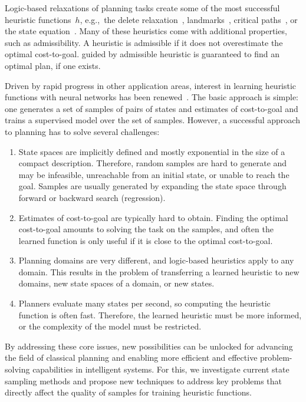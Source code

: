 Logic-based relaxations of planning tasks create some of the most successful heuristic functions~$h$, e.g.,~the delete relaxation~\cite{Hoffmann.Nebel/2001}, landmarks~\cite{hoffmann-et-al-jair2004,Karpas.Domshlak/2009}, critical paths~\cite{haslum-geffner-aips2000}, or the state equation~\cite{bonet-ijcai2013}. Many of these heuristics come with additional properties, such as admissibility. A heuristic is admissible if it does not overestimate the optimal cost-to-goal. \astar guided by admissible heuristic is guaranteed to find an optimal plan, if one exists.

Driven by rapid progress in other application areas, interest in learning heuristic functions with neural networks has been renewed~\cite{samadi-et-al-aaai2008,Arfaee.etal/2011,Agostinelli.etal/2019,Yu.etal/2020,Shen.etal/2020,Ferber.etal/2020a,Toyer.etal/2020,Ferber.etal/2022,OToole/2022}. The basic approach is simple: one generates a set of samples of pairs of states and estimates of cost-to-goal and trains a supervised model over the set of samples. However, a successful approach to planning has to solve several challenges:

\begin{enumerate}[label=C\arabic*),left=0pt]
    \itemsep0pt
    \item State spaces are implicitly defined and mostly exponential in the size of a compact description. Therefore, random samples are hard to generate and may be infeasible, unreachable from an initial state, or unable to reach the goal. Samples are usually generated by expanding the state space through forward or backward search (regression).
    \item Estimates of cost-to-goal are typically hard to obtain. Finding the optimal cost-to-goal amounts to solving the task on the samples, and often the learned function is only useful if it is close to the optimal cost-to-goal.
    \item Planning domains are very different, and logic-based heuristics apply to any domain. This results in the problem of transferring a learned heuristic to new domains, new state spaces of a domain, or new states.
    \item Planners evaluate many states per second, so computing the heuristic function is often fast. Therefore, the learned heuristic must be more informed, or the complexity of the model must be restricted.
\end{enumerate}

By addressing these core issues, new possibilities can be unlocked for advancing the field of classical planning and enabling more efficient and effective problem-solving capabilities in intelligent systems.  For this, we investigate current state sampling methods and propose new techniques to address key problems that directly affect the quality of samples for training heuristic functions.

